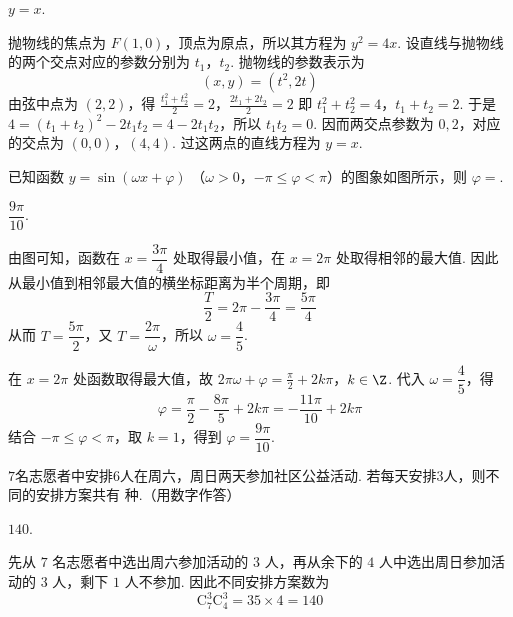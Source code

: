 \begin{answer}
\(y=x\).
\end{answer}

\begin{solution}
抛物线的焦点为 \(F(1,0)\)，顶点为原点，所以其方程为
\(y^2=4x\). 设直线与抛物线的两个交点对应的参数分别为 \(t_1\)，\(t_2\). 抛物线的参数表示为
\[
(x,y)=(t^2,2t)
\]
由弦中点为 \((2,2)\)，得
\(\frac{t_1^2+t_2^2}{2}=2\)，\(\frac{2t_1+2t_2}{2}=2\)
即
\(t_1^2+t_2^2=4\)，\(t_1+t_2=2\).
于是
\(4=(t_1+t_2)^2-2t_1t_2=4-2t_1t_2\)，所以 \(t_1t_2=0\). 因而两交点参数为 \(0,2\)，对应的交点为 \((0,0)\)，\((4,4)\). 过这两点的直线方程为
\(y=x\).
\end{solution}

\begin{problem}
已知函数 \( y = \sin (\omega x + \varphi) \) （\(\omega > 0\)，\(-\pi \leqslant \varphi < \pi\)）的图象如图所示，则 \(\varphi = \)\fillinblank{}.

\end{problem}

\begin{answer}
\(\dfrac{9\pi}{10}\).
\end{answer}

\begin{solution}
由图可知，函数在 \(x=\dfrac{3\pi}{4}\) 处取得最小值，在 \(x=2\pi\) 处取得相邻的最大值. 因此从最小值到相邻最大值的横坐标距离为半个周期，即
\[
\frac{T}{2}=2\pi-\frac{3\pi}{4}=\frac{5\pi}{4}
\]
从而 \(T=\dfrac{5\pi}{2}\)，又 \(T=\dfrac{2\pi}{\omega}\)，所以
\(\omega=\dfrac45\).

在 \(x=2\pi\) 处函数取得最大值，故
\(2\pi\omega+\varphi=\frac\pi2+2k\pi\)，\(k\in\Z\).
代入 \(\omega=\dfrac45\)，得
\[
\varphi=\frac\pi2-\frac{8\pi}{5}+2k\pi=-\frac{11\pi}{10}+2k\pi
\]
结合 \(-\pi\leqslant\varphi<\pi\)，取 \(k=1\)，得到
\(\varphi=\dfrac{9\pi}{10}\).
\end{solution}

\begin{problem}
\(7\)名志愿者中安排\(6\)人在周六，周日两天参加社区公益活动. 若每天安排\(3\)人，则不同的安排方案共有\fillinblank{} 种.（用数字作答）
\end{problem}

\begin{answer}
\(140\).
\end{answer}

\begin{solution}
先从 \(7\) 名志愿者中选出周六参加活动的 \(3\) 人，再从余下的 \(4\) 人中选出周日参加活动的 \(3\) 人，剩下 \(1\) 人不参加. 因此不同安排方案数为
\[
\mathrm C_7^3\mathrm C_4^3=35\times4=140
\]
\end{solution}

